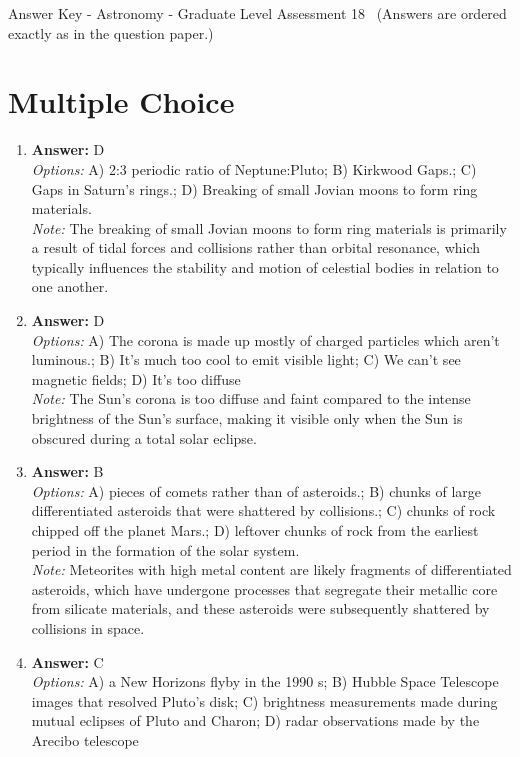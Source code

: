 \documentclass[12pt]{article}
\begin{document}
\begin{center}
Answer Key - Astronomy - Graduate Level Assessment 18 \
\small (Answers are ordered exactly as in the question paper.)
\end{center}

\section*{Multiple Choice}
\begin{enumerate}[label=\arabic*.]
\item \textbf{Answer:} D
\\ \textit{Options:} A) 2:3 periodic ratio of Neptune:Pluto; B) Kirkwood Gaps.; C) Gaps in Saturn's rings.; D) Breaking of small Jovian moons to form ring materials.
\\ \textit{Note:} The breaking of small Jovian moons to form ring materials is primarily a result of tidal forces and collisions rather than orbital resonance, which typically influences the stability and motion of celestial bodies in relation to one another.
\item \textbf{Answer:} D
\\ \textit{Options:} A) The corona is made up mostly of charged particles which aren't luminous.; B) It's much too cool to emit visible light; C) We can't see magnetic fields; D) It's too diffuse
\\ \textit{Note:} The Sun's corona is too diffuse and faint compared to the intense brightness of the Sun's surface, making it visible only when the Sun is obscured during a total solar eclipse.
\item \textbf{Answer:} B
\\ \textit{Options:} A) pieces of comets rather than of asteroids.; B) chunks of large differentiated asteroids that were shattered by collisions.; C) chunks of rock chipped off the planet Mars.; D) leftover chunks of rock from the earliest period in the formation of the solar system.
\\ \textit{Note:} Meteorites with high metal content are likely fragments of differentiated asteroids, which have undergone processes that segregate their metallic core from silicate materials, and these asteroids were subsequently shattered by collisions in space.
\item \textbf{Answer:} C
\\ \textit{Options:} A) a New Horizons flyby in the 1990 s; B) Hubble Space Telescope images that resolved Pluto's disk; C) brightness measurements made during mutual eclipses of Pluto and Charon; D) radar observations made by the Arecibo telescope

\end{enumerate}
\end{document}
